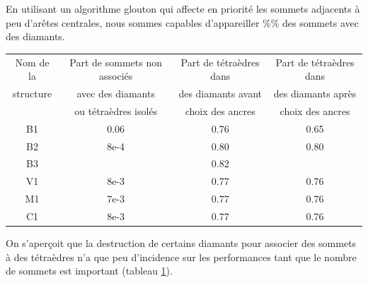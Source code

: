 \documentclass[a4paper,11pt,openany]{article}
\begin{document}
\noindent
En utilisant un algorithme glouton qui affecte en priorité les sommets adjacents à peu d'arêtes centrales, nous sommes capables d'appareiller \%\% des sommets avec des diamants.
\begin{table}[H]
\footnotesize
\begin{tabular}{|c | c | c | c |}
\hline
Nom de la & Part de sommets non associés & Part de tétraèdres dans  & Part de tétraèdres dans \\
structure&avec des diamants  & des diamants avant & des diamants après \\
& ou tétraèdres isolés & choix des ancres& choix des ancres\\
\hline
B1 & 0.06 & 0.76 & 0.65 \\
B2 & 8e-4 & 0.80 & 0.80 \\
B3 &  & 0.82 & \\
V1 & 8e-3  & 0.77 & 0.76 \\
M1 & 7e-3 & 0.77 & 0.76\\
C1 & 8e-3 & 0.77 & 0.76 \\
\hline  
\end{tabular}
\label{Tab:results_ancres}
\end{table}

\begin{figure}[H]
\begin{center}
\end{center}
\end{figure}
\noindent
On s'aper\c coit que la destruction de certains diamants pour associer des sommets à des tétraèdres n'a que peu d'incidence sur les performances tant que le nombre de sommets est important (tableau \ref{Tab:results_ancres}).
\end{document}
